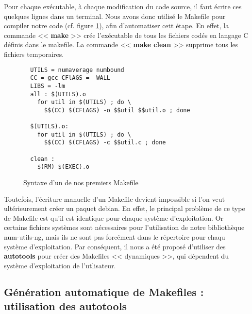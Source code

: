 Pour chaque ex\'ecutable, \`a chaque modification du code source, il faut \'ecrire ces quelques lignes dans un terminal.
Nous avons donc utilis\'e le Makefile pour compiler notre code (cf. figure \ref{fig:exemple_makefile}), afin d'automatiser cett \'etape.
En effet, la commande << \textbf{make} >> cr\'ee l'ex\'ecutable de tous les fichiers cod\'es en langage C d\'efinis dans le makefile. La commande
<< \textbf{make clean} >> supprime tous les fichiers temporaires.
\newline
\begin{figure}[h] 
\begin{center}

\begin{minipage}[|c|]{0.7\linewidth}
\begin{verbatim}
  UTILS = numaverage numbound
  CC = gcc CFlAGS = -WALL
  LIBS = -lm
  all : $(UTILS).o
    for util in $(UTILS) ; do \
      $$(CC) $(CFLAGS) -o $$util $$util.o ; done

  $(UTILS).o:
    for util in $(UTILS) ; do \
      $$(CC) $(CFLAGS) -c $$util.c ; done

  clean :
    $(RM) $(EXEC).o
\end{verbatim}
\end{minipage}
\end{center}
\caption{Syntaxe d'un de nos premiers Makefile}
\label{fig:exemple_makefile}
\end{figure}

Toutefois, l'\'ecriture manuelle d'un Makefile devient impossible si l'on veut ult\'erieurement cr\'eer un paquet debian.
En effet, le principal probl\`eme de ce type de Makefile est qu'il est identique pour chaque syst\`eme d'exploitation. Or certains fichiers
syst\`emes sont n\'ecessaires pour l'utilisation de notre biblioth\`eque num-utils-ng, mais ils ne sont pas forc\'ement dans le r\'epertoire pour
chaqu syst\`eme d'exploitation.
\newline 	
Par cons\'equent, il nous a \'et\'e propos\'e d'utiliser des \textbf{autotools} pour cr\'eer des Makefiles << dynamiques >>, qui d\'ependent du syst\`eme
d'exploitation de l'utlisateur.

\subsection{G\'en\'eration automatique de Makefiles : utilisation des autotools}

